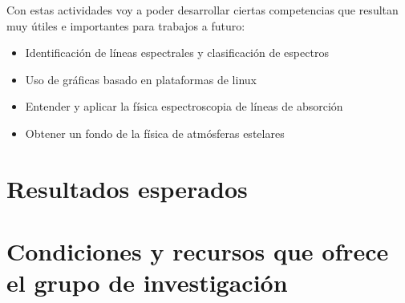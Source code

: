 \documentclass[11pt]{article}
\begin{document}
Con estas actividades voy a poder desarrollar ciertas competencias que resultan muy útiles e importantes para trabajos a futuro:

\begin{itemize}
    \item Identificación de líneas espectrales y clasificación de espectros
    \item Uso de gráficas basado en plataformas de linux
    \item Entender y aplicar la física espectroscopia de líneas de absorción
    \item Obtener un fondo de la física de atmósferas estelares
\end{itemize}

\section{Resultados esperados}

\section{Condiciones y recursos que ofrece el grupo de investigación}
\end{document}
